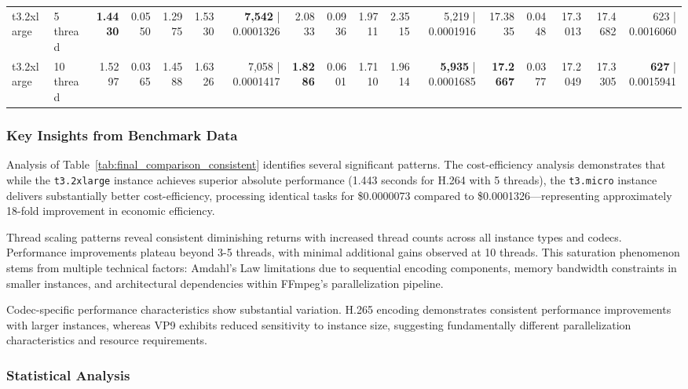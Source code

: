\documentclass[conference]{IEEEtran}
\begin{document}
\begin{table}[h]
{\begin{tabular}{ll|rrrrr|rrrrr|rrrrr}
				t3.2xlarge & 5 thread & \textbf{1.4430} & 0.0550 & 1.2975 & 1.5330 & \textbf{7,542} | 0.0001326 & 2.0833 & 0.0936 & 1.9711 & 2.3515 & 5,219 | 0.0001916 & 17.3835 & 0.0448 & 17.3013 & 17.4682 & 623 | 0.0016060 \\
				t3.2xlarge & 10 thread & 1.5297 & 0.0365 & 1.4588 & 1.6326 & 7,058 | 0.0001417 & \textbf{1.8286} & 0.0601 & 1.7110 & 1.9614 & \textbf{5,935} | 0.0001685 & \textbf{17.2667} & 0.0377 & 17.2049 & 17.3305 & \textbf{627} | 0.0015941 \\
				\bottomrule
			\end{tabular}
		}
	\end{table}
	
	\subsubsection{Key Insights from Benchmark Data}
	
	Analysis of Table~\ref{tab:final_comparison_consistent} identifies several significant patterns. The cost-efficiency analysis demonstrates that while the \texttt{t3.2xlarge} instance achieves superior absolute performance (1.443 seconds for H.264 with 5 threads), the \texttt{t3.micro} instance delivers substantially better cost-efficiency, processing identical tasks for \$0.0000073 compared to \$0.0001326—representing approximately 18-fold improvement in economic efficiency.
	
	Thread scaling patterns reveal consistent diminishing returns with increased thread counts across all instance types and codecs. Performance improvements plateau beyond 3-5 threads, with minimal additional gains observed at 10 threads. This saturation phenomenon stems from multiple technical factors: Amdahl's Law limitations due to sequential encoding components, memory bandwidth constraints in smaller instances, and architectural dependencies within FFmpeg's parallelization pipeline.
	
	Codec-specific performance characteristics show substantial variation. H.265 encoding demonstrates consistent performance improvements with larger instances, whereas VP9 exhibits reduced sensitivity to instance size, suggesting fundamentally different parallelization characteristics and resource requirements.
	
	\subsubsection{Statistical Analysis}
	
\end{document}
